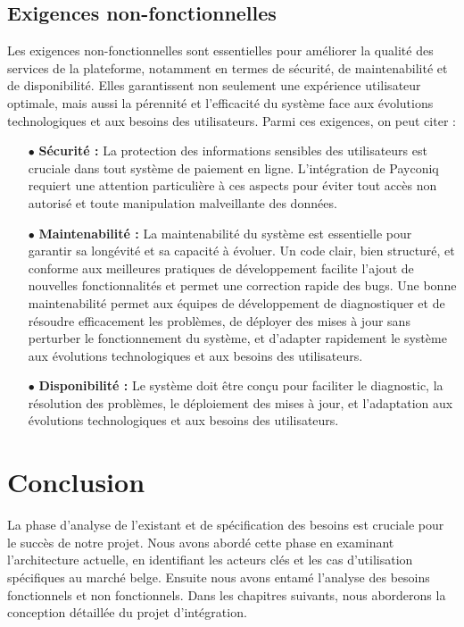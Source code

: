 \subsection{Exigences non-fonctionnelles}

Les exigences non-fonctionnelles sont essentielles pour améliorer la qualité des services de la plateforme, notamment en termes de sécurité, de maintenabilité et de disponibilité. Elles garantissent non seulement une expérience utilisateur optimale, mais aussi la pérennité et l'efficacité du système face aux évolutions technologiques et aux besoins des utilisateurs. Parmi ces exigences, on peut citer :

\begin{itemize}
    \item [$\bullet$]\textbf{Sécurité :} La protection des informations sensibles des utilisateurs est cruciale dans tout système de paiement en ligne. L'intégration de Payconiq requiert une attention particulière à ces aspects pour éviter tout accès non autorisé et toute manipulation malveillante des données.
    \item [$\bullet$]\textbf{Maintenabilité :} La maintenabilité du système est essentielle pour garantir sa longévité et sa capacité à évoluer. Un code clair, bien structuré, et conforme aux meilleures pratiques de développement facilite l'ajout de nouvelles fonctionnalités et permet une correction rapide des bugs. Une bonne maintenabilité permet aux équipes de développement de diagnostiquer et de résoudre efficacement les problèmes, de déployer des mises à jour sans perturber le fonctionnement du système, et d'adapter rapidement le système aux évolutions technologiques et aux besoins des utilisateurs.
    \item [$\bullet$]\textbf{Disponibilité :} Le système doit être conçu pour faciliter le diagnostic, la résolution des problèmes, le déploiement des mises à jour, et l’adaptation aux évolutions technologiques et aux besoins des utilisateurs.
\end{itemize}


\section*{Conclusion}
La phase d'analyse de l'existant et de spécification des besoins est cruciale pour le succès de notre projet. Nous avons abordé cette phase en examinant l'architecture actuelle, en identifiant les acteurs clés et les cas d'utilisation spécifiques au marché belge. Ensuite nous avons entamé l'analyse des besoins fonctionnels et non fonctionnels. Dans les chapitres suivants, nous aborderons la conception détaillée du projet d'intégration.